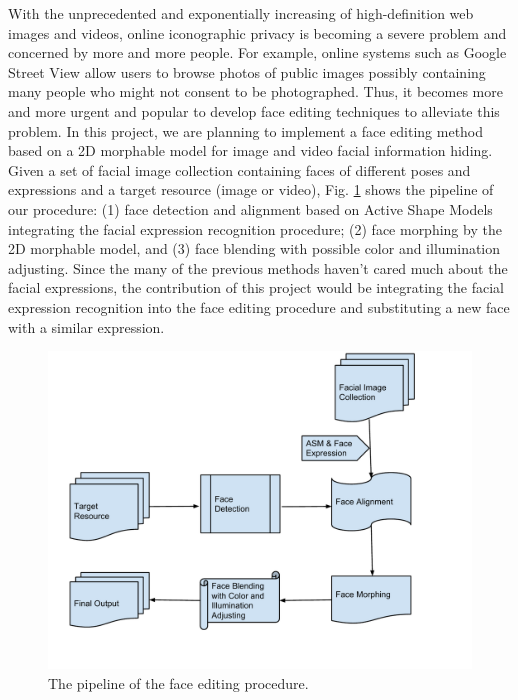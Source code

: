 \documentclass[10pt,letterpaper]{article}
\begin{document}
%
% 
With the unprecedented and exponentially increasing of high-definition web images and videos, online iconographic privacy is becoming a severe problem and concerned by more and more people. For example, online systems such as Google Street View allow users to browse photos of public images possibly containing many people who might not consent to be photographed. Thus, it becomes more and more urgent and popular to develop face editing techniques to alleviate this problem. In this project, we are planning to implement a face editing method based on a 2D morphable model for image and video facial information hiding. Given a set of facial image collection containing faces of different poses and expressions and a target resource (image or video), Fig. \ref{fig:pipeline} shows the pipeline of our procedure: (1) face detection and alignment based on Active Shape Models integrating the facial expression recognition procedure; (2) face morphing by the 2D morphable model, and (3) face blending with possible color and illumination adjusting. Since the many of the previous methods haven't cared much about the facial expressions, the contribution of this project would be integrating the facial expression recognition into the face editing procedure and substituting a new face with a similar expression.


\begin{figure}[th]
\begin{center}
 \includegraphics[width=0.5\linewidth]{fig/Flowchart.pdf} 
\end{center}
   \caption{The pipeline of the face editing procedure.}
\label{fig:pipeline}
 
\end{figure}
\end{document}
